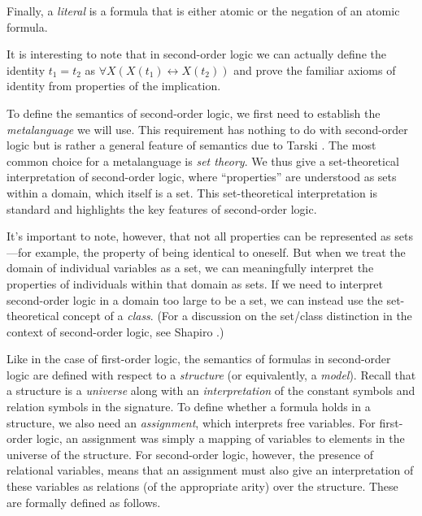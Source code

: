 \documentclass[11pt,twoside=off,numbers=noenddot]{scrbook}
\begin{document}
Finally, a \emph{literal} is a formula that is either atomic or the negation of an atomic formula.

\begin{remark}
  It is interesting to note that in second-order logic we can actually define the identity $t_1 = t_2$ as $\forall X (X(t_1) \leftrightarrow X(t_2))$ and prove the familiar axioms of identity from properties of the implication.
\end{remark}

To define the semantics of second-order logic, we first need to establish the \emph{metalanguage} we will use. This requirement has nothing to do with second-order logic but is rather a general feature of semantics due to Tarski \cite{tarski1956concept}. The most common choice for a metalanguage is \emph{set theory}. We thus give a set-theoretical interpretation of second-order logic, where ``properties'' are understood as sets within a domain, which itself is a set. This set-theoretical interpretation is standard and highlights the key features of second-order logic.

\begin{remark}
  It's important to note, however, that not all properties can be represented as sets—for example, the property of being identical to oneself. But when we treat the domain of individual variables as a set, we can meaningfully interpret the properties of individuals within that domain as sets. If we need to interpret second-order logic in a domain too large to be a set, we can instead use the set-theoretical concept of a \emph{class}. (For a discussion on the set/class distinction in the context of second-order logic, see Shapiro \cite{shapiro1991foundations}.)
\end{remark}

Like in the case of first-order logic, the semantics of formulas in second-order logic are defined with respect to a \emph{structure} (or equivalently, a \emph{model}). Recall that a structure is a \emph{universe} along with an \emph{interpretation} of the constant symbols and relation symbols in the signature. To define whether a formula holds in a structure, we also need an \emph{assignment}, which interprets free variables. For first-order logic, an assignment was simply a mapping of variables to elements in the universe of the structure. For second-order logic, however, the presence of relational variables, means that an assignment must also give an interpretation of these variables as relations (of the appropriate arity) over the structure. These are formally defined as follows.
\end{document}
